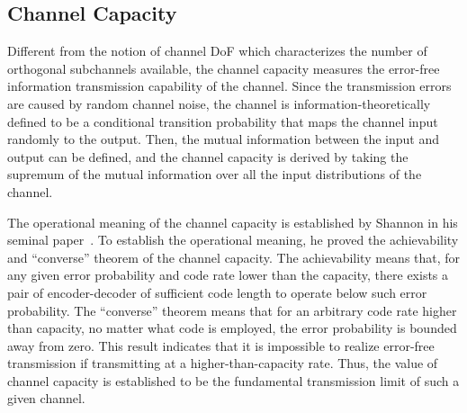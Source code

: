 \documentclass[journal,twocolumn]{IEEEtran}
\begin{document}

\subsection{Channel Capacity}
\label{Sec_2_Subsec_2}
Different from the notion of channel DoF which characterizes the number of orthogonal subchannels available, the channel capacity measures the error-free information transmission capability of the channel. 
Since the transmission errors are caused by random channel noise, the channel is information-theoretically defined to be a conditional transition probability that maps the channel input randomly to the output. 
Then, the mutual information between the input and output can be defined, and the channel capacity is derived by taking the supremum of the mutual information over all the input distributions of the channel. 

The operational meaning of the channel capacity is established by Shannon in his seminal paper~\cite{shannon1948mathematical}. To establish the operational meaning, he proved the achievability and ``converse'' theorem of the channel capacity. The achievability means that, for any given error probability and code rate lower than the capacity, there exists a pair of encoder-decoder of sufficient code length to operate below such error probability. 
The ``converse'' theorem means that for an arbitrary code rate higher than capacity, no matter what code is employed, the error probability is bounded away from zero. This result indicates that it is impossible to realize error-free transmission if transmitting at a higher-than-capacity rate. Thus, the value of channel capacity is established to be the fundamental transmission limit of such a given channel. 
\end{document}
